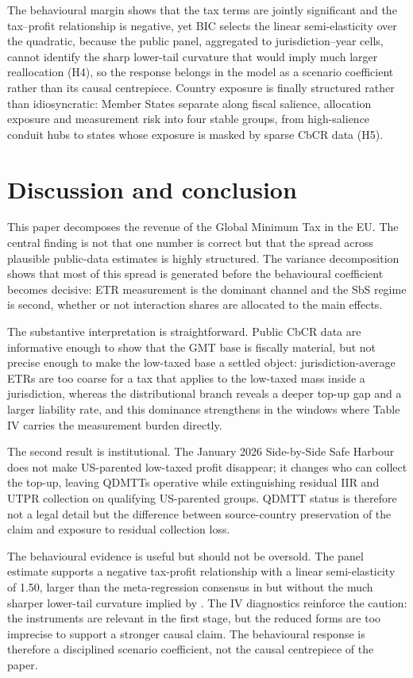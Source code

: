 \documentclass[11pt,a4paper]{article}
\begin{document}
The behavioural margin shows that the tax terms are jointly significant and the tax--profit relationship is negative, yet BIC selects the linear semi-elasticity over the quadratic, because the public panel, aggregated to jurisdiction--year cells, cannot identify the sharp lower-tail curvature that would imply much larger reallocation (H4), so the response belongs in the model as a scenario coefficient rather than its causal centrepiece. Country exposure is finally structured rather than idiosyncratic: Member States separate along fiscal salience, allocation exposure and measurement risk into four stable groups, from high-salience conduit hubs to states whose exposure is masked by sparse CbCR data (H5).

\section{Discussion and conclusion}\label{sec:discussion}\label{sec:limitations}

This paper decomposes the revenue of the Global Minimum Tax in the EU. The central finding is not that one number is correct but that the spread across plausible public-data estimates is highly structured. The variance decomposition shows that most of this spread is generated before the behavioural coefficient becomes decisive: ETR measurement is the dominant channel and the SbS regime is second, whether or not interaction shares are allocated to the main effects.

The substantive interpretation is straightforward. Public CbCR data are informative enough to show that the GMT base is fiscally material, but not precise enough to make the low-taxed base a settled object: jurisdiction-average ETRs are too coarse for a tax that applies to the low-taxed mass inside a jurisdiction, whereas the distributional branch reveals a deeper top-up gap and a larger liability rate, and this dominance strengthens in the windows where Table IV carries the measurement burden directly.

The second result is institutional. The January 2026 Side-by-Side Safe Harbour does not make US-parented low-taxed profit disappear; it changes who can collect the top-up, leaving QDMTTs operative while extinguishing residual IIR and UTPR collection on qualifying US-parented groups. QDMTT status is therefore not a legal detail but the difference between source-country preservation of the claim and exposure to residual collection loss.

The behavioural evidence is useful but should not be oversold. The panel estimate supports a negative tax-profit relationship with a linear semi-elasticity of 1.50, larger than the meta-regression consensus in \citet{heckemeyer2017} but without the much sharper lower-tail curvature implied by \citet{dowd2017}. The IV diagnostics reinforce the caution: the instruments are relevant in the first stage, but the reduced forms are too imprecise to support a stronger causal claim. The behavioural response is therefore a disciplined scenario coefficient, not the causal centrepiece of the paper.
\end{document}
